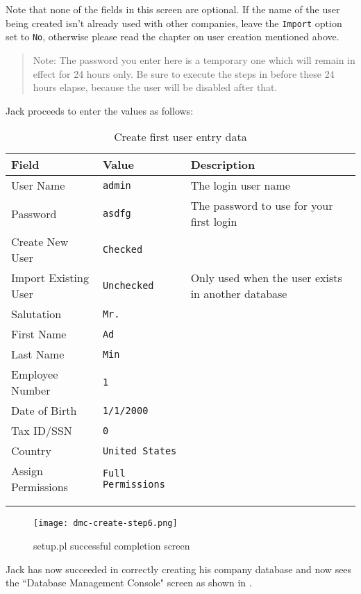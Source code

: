 Note that none of the fields in this screen are optional. If the name of the user being created
isn't already used with other companies, leave the \texttt{Import} option set to \texttt{No},
otherwise please read the chapter on user creation mentioned above.

\begin{quotation}
Note: The password you enter here is a temporary one which will remain in effect for 24
hours only. Be sure to execute the steps in  before
these 24 hours elapse, because the user will be disabled after that.
\end{quotation}

Jack proceeds to enter the values as follows:
\begin{longtable}{ llp{6cm} }
        Field & Value & Description \\ \hline
        \endhead
        User Name & \texttt{admin} & The login user name\\
        Password & \texttt{asdfg} & The password to use for your first login\\
        Create New User & \texttt{Checked} & \\
        Import Existing User & \texttt{Unchecked} & Only used when the user exists in another database\\
        Salutation & \texttt{Mr.} & \\
        First Name &  \texttt{Ad} & \\
        Last Name & \texttt{Min} & \\
        Employee Number & \texttt{1} & \\
        Date of Birth & \texttt{1/1/2000} & \\
        Tax ID/SSN & \texttt{0} & \\
        Country & \texttt{United States} & \\
        Assign Permissions & \texttt{Full Permissions} & \\
        \\
        \caption{Create first user entry data}
        \label{tbl:setupp-step5-user-entry-data}
\end{longtable}

\begin{figure}[h]
\centering
\texttt{[image: dmc-create-step6.png]}
\caption{setup.pl successful completion screen}
\label{fig:setup-step6}
\end{figure}

Jack has now succeeded in correctly creating his company database and now sees the
 ``Database Management Console"  screen as shown in .

